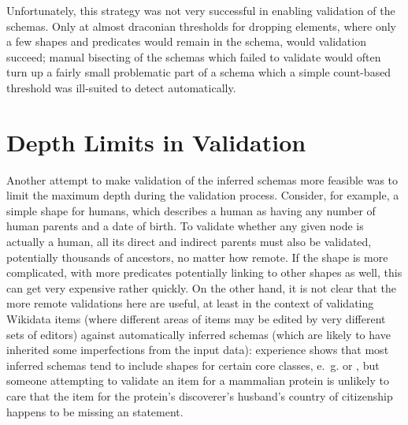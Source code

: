 Unfortunately, this strategy was not very successful in enabling validation of the \glspl{schema}.
Only at almost draconian thresholds for dropping elements,
where only a few \glspl{shape} and \glspl{predicate} would remain in the \gls{schema},
would validation succeed;
manual bisecting of the \glspl{schema} which failed to validate
would often turn up a fairly small problematic part of a \gls{schema}
which a simple count-based threshold was ill-suited to detect automatically.

\section{Depth Limits in Validation}
\label{sec:RDF2Graph+Wikidata:depth-limit}

Another attempt to make validation of the inferred \glspl{schema} more feasible
was to limit the maximum depth during the validation process.
Consider, for example, a simple \gls{shape} for humans, %
which describes a human as having any number of human parents and a date of birth.
To validate whether any given node is actually a human,
all its direct and indirect parents must also be validated,
potentially thousands of ancestors, no matter how remote.
If the \gls{shape} is more complicated,
with more predicates potentially linking to other \glspl{shape} as well,
this can get very expensive rather quickly.
On the other hand, it is not clear that the more remote validations here are useful,
at least in the context of validating \gls{Wikidata} \glspl{item}
(where different areas of \glspl{item} may be edited by very different sets of editors)
against automatically inferred \glspl{schema}
(which are likely to have inherited some imperfections from the input data): %
experience shows that %
most inferred \glspl{schema} tend to include \glspl{shape} for certain core classes,
e.~g.  or ,
but someone attempting to validate an \gls{item} for a mammalian protein
is unlikely to care that the \gls{item} for the protein’s discoverer’s husband’s country of citizenship %
happens to be missing an  statement.

